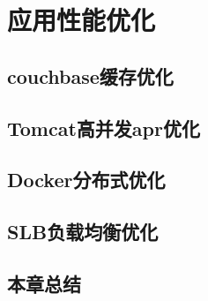\chapter{应用性能优化}
\label{cha:ApplicationOptimization}
\section{couchbase缓存优化}
\section{Tomcat高并发apr优化}
\section{Docker分布式优化}
\section{SLB负载均衡优化}
\section{本章总结}